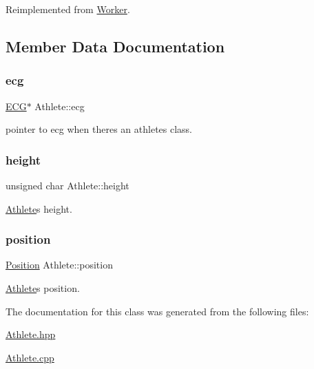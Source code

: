 Reimplemented from \hyperlink{class_worker_a7d06c15a1d9872d629988aa054996627}{Worker}.



\subsection{Member Data Documentation}
\hypertarget{class_athlete_aa9576b3d16acdbe4c6efaeed68f690d7}{}\label{class_athlete_aa9576b3d16acdbe4c6efaeed68f690d7} 
\subsubsection{\texorpdfstring{ecg}{ecg}}
{\footnotesize\ttfamily \hyperlink{class_e_c_g}{E\+CG}$\ast$ Athlete\+::ecg\hspace{0.3cm}{\ttfamily [protected]}}



pointer to ecg when there\textquotesingle{}s an athlete\textquotesingle{}s class. 

\hypertarget{class_athlete_a80a64bb1d5c943aaa7ca152d596d9914}{}\label{class_athlete_a80a64bb1d5c943aaa7ca152d596d9914} 
\subsubsection{\texorpdfstring{height}{height}}
{\footnotesize\ttfamily unsigned char Athlete\+::height\hspace{0.3cm}{\ttfamily [protected]}}



\hyperlink{class_athlete}{Athlete}\textquotesingle{}s height. 

\hypertarget{class_athlete_ab6c8f0df2238999ed76e563510ac0b38}{}\label{class_athlete_ab6c8f0df2238999ed76e563510ac0b38} 
\subsubsection{\texorpdfstring{position}{position}}
{\footnotesize\ttfamily \hyperlink{_utils_8hpp_ab91b34ae619fcdfcba4522b4f335bf83}{Position} Athlete\+::position\hspace{0.3cm}{\ttfamily [protected]}}



\hyperlink{class_athlete}{Athlete}\textquotesingle{}s position. 



The documentation for this class was generated from the following files\+:\begin{DoxyCompactItemize}
\item 
\hyperlink{_athlete_8hpp}{Athlete.\+hpp}\item 
\hyperlink{_athlete_8cpp}{Athlete.\+cpp}\end{DoxyCompactItemize}
